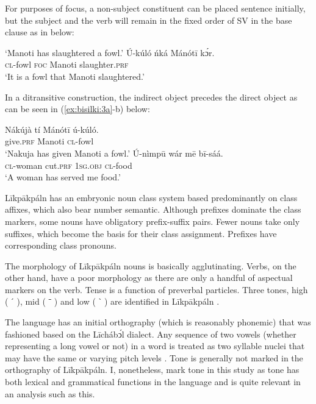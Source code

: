 \documentclass[output=paper,colorlinks,citecolor=brown]{langscibook}
\begin{document}
For purposes of focus, a non-subject constituent can be placed sentence initially, but the subject and the verb will remain in the fixed order of SV in the base clause as in  below:

\ea%
    \label{ex:bisilki:2}
    \glt    ‘Manoti has slaughtered a fowl.’
    \ex\label{ex:bisilki:2b}
    \gll    Ú-kúló	ńká	Mánótī	kɔ́r.\\
            \textsc{cl-}fowl	\textsc{foc}	Manoti	slaughter\textsc{.prf}\\
    \glt    ‘It is a fowl that Manoti slaughtered.’
    \z
\z

In a ditransitive construction, the indirect object precedes the direct object as can be seen in (\ref{ex:bisilki:3a}-b) below:

\ea%
    \label{ex:bisilki:3}
    \ea\label{ex:bisilki:3a}
    \gll    Nákújà	tí		Mánótī	ú-kúló.\\
            give\textsc{.prf} {}	Manoti	\textsc{cl-}fowl\\
    \glt    ‘Nakuja has given Manoti a fowl.’
    \ex\label{ex:bisilki:3b}
    \gll    Ú-nìmpū	wár		mē		bī-sáá.\\
            \textsc{cl-}woman	cut\textsc{.prf}	\textsc{1sg.obj}	\textsc{cl-}food\\
    \glt    ‘A woman has served me food.’
    \z
\z

Līkpākpáln has an embryonic noun class system based predominantly on class affixes, which also bear number semantic. Although prefixes dominate the class markers, some nouns have obligatory prefix-suffix pairs. Fewer nouns take only suffixes, which become the basis for their class assignment. Prefixes have corresponding class pronouns.

The morphology of Līkpākpáln nouns is basically agglutinating. Verbs, on the other hand, have a poor morphology as there are only a handful of aspectual markers on the verb. Tense is a function of preverbal particles. Three tones, high ( ˊ ), mid ( ˉ ) and low ( ˋ ) are identified in Līkpākpáln \citep[16]{SteeleWeed1966}.

The language has an initial orthography (which is reasonably phonemic) that was fashioned based on the Līchábͻ́l dialect. Any sequence of two vowels (whether representing a long vowel or not) in a word is treated as two syllable nuclei that may have the same or varying pitch levels \citep{BisilkiAkpanglo-Nartey2017}. Tone is generally not marked in the orthography of Līkpākpáln. I, nonetheless, mark tone in this study as tone has both lexical and grammatical functions in the language and is quite relevant in an analysis such as this.
\end{document}
